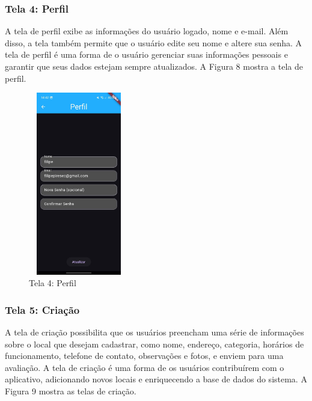     \FloatBarrier

\subsubsection{Tela 4: Perfil}

    A tela de perfil exibe as informações do usuário logado, nome e e-mail. Além disso, a tela também permite que o usuário edite seu nome e altere sua senha. A tela de perfil é uma forma de o usuário gerenciar suas informações pessoais e garantir que seus dados estejam sempre atualizados. A Figura 8 mostra a tela de perfil.

    \begin{figure}[h]
        \centering
        \includegraphics[width=44mm,height=80mm]{imagens/perfil.jpg}
        \caption{\scriptsize Tela 4: Perfil}
        \footnotesize  {}
        \label{fig:tela4}
    \end{figure}

    \FloatBarrier

\subsubsection{Tela 5: Criação}

    A tela de criação possibilita que os usuários preencham uma série de informações sobre o local que desejam cadastrar, como nome, endereço, categoria, horários de funcionamento, telefone de contato, observações e fotos, e enviem para uma avaliação. A tela de criação é uma forma de os usuários contribuírem com o aplicativo, adicionando novos locais e enriquecendo a base de dados do sistema. A Figura 9 mostra as telas de criação.

